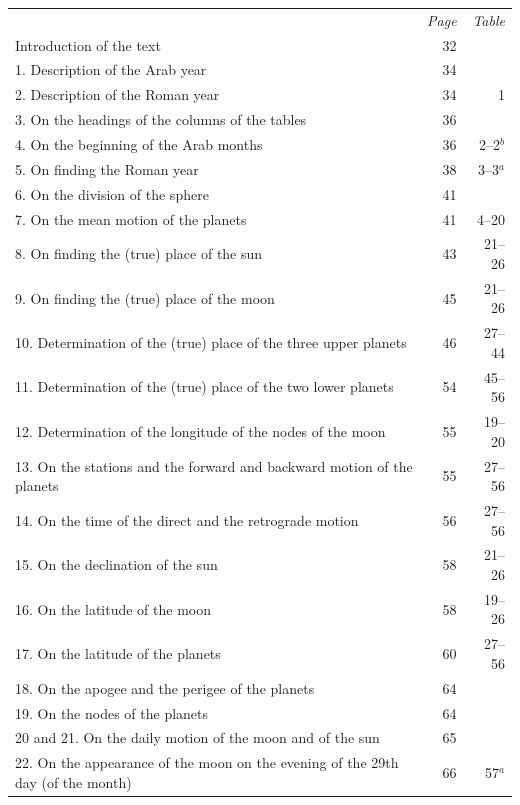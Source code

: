 \documentclass[11pt]{article}
\begin{document}
\begin{center}\small\begin{tabular}{lrr}
 & \emph{Page} & \emph{Table} \\
Introduction of the text & 32 &  \\
1. Description of the Arab year & 34 &  \\
2. Description of the Roman year & 34 & 1 \\
3. On the headings of the columns of the tables & 36 &  \\
4. On the beginning of the Arab months & 36 & 2–2$^{b}$ \\
5. On finding the Roman year & 38 & 3–3$^{a}$ \\
6. On the division of the sphere & 41 &  \\
7. On the mean motion of the planets & 41 & 4–20 \\
8. On finding the (true) place of the sun & 43 & 21–26 \\
9. On finding the (true) place of the moon & 45 & 21–26 \\
10. Determination of the (true) place of the three upper planets & 46 & 27–44 \\
11. Determination of the (true) place of the two lower planets & 54 & 45–56 \\
12. Determination of the longitude of the nodes of the moon & 55 & 19–20 \\
13. On the stations and the forward and backward motion of the planets & 55 & 27–56 \\
14. On the time of the direct and the retrograde motion & 56 & 27–56 \\
15. On the declination of the sun & 58 & 21–26 \\
16. On the latitude of the moon & 58 & 19–26 \\
17. On the latitude of the planets & 60 & 27–56 \\
18. On the apogee and the perigee of the planets & 64 &  \\
19. On the nodes of the planets & 64 &  \\
20 and 21. On the daily motion of the moon and of the sun & 65 &  \\
22. On the appearance of the moon on the evening of the 29th day (of the month) & 66 & 57$^{a}$ \\
\end{tabular}\end{center}
\end{document}
